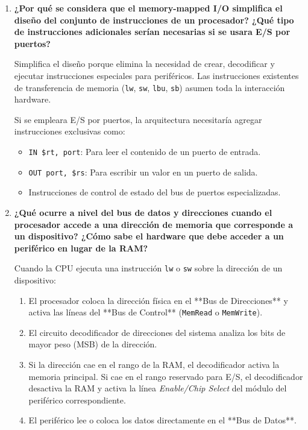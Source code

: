 \documentclass[12pt,letterpaper]{article}
\begin{document}
\begin{enumerate}
    \item \textbf{\large\color{UCBlue}¿Por qué se considera que el memory-mapped I/O simplifica el diseño del conjunto de instrucciones de un procesador? ¿Qué tipo de instrucciones adicionales serían necesarias si se usara E/S por puertos?}
    
    \vspace{0.2cm}
    Simplifica el diseño porque elimina la necesidad de crear, decodificar y ejecutar instrucciones especiales para periféricos. Las instrucciones existentes de transferencia de memoria (\texttt{lw}, \texttt{sw}, \texttt{lbu}, \texttt{sb}) asumen toda la interacción hardware.
    
    Si se empleara E/S por puertos, la arquitectura necesitaría agregar instrucciones exclusivas como:
    \begin{itemize}
        \item \texttt{IN \$rt, port}: Para leer el contenido de un puerto de entrada.
        \item \texttt{OUT port, \$rs}: Para escribir un valor en un puerto de salida.
        \item Instrucciones de control de estado del bus de puertos especializadas.
    \end{itemize}

    \item \textbf{\large\color{UCBlue}¿Qué ocurre a nivel del bus de datos y direcciones cuando el procesador accede a una dirección de memoria que corresponde a un dispositivo? ¿Cómo sabe el hardware que debe acceder a un periférico en lugar de la RAM?}
    
    \vspace{0.2cm}
    Cuando la CPU ejecuta una instrucción \texttt{lw} o \texttt{sw} sobre la dirección de un dispositivo:
    \begin{enumerate}[label=\arabic*.]
        \item El procesador coloca la dirección física en el **Bus de Direcciones** y activa las líneas del **Bus de Control** (\texttt{MemRead} o \texttt{MemWrite}).
        \item El circuito decodificador de direcciones del sistema analiza los bits de mayor peso (MSB) de la dirección.
        \item Si la dirección cae en el rango de la RAM, el decodificador activa la memoria principal. Si cae en el rango reservado para E/S, el decodificador desactiva la RAM y activa la línea \textit{Enable/Chip Select} del módulo del periférico correspondiente.
        \item El periférico lee o coloca los datos directamente en el **Bus de Datos**.
    \end{enumerate}


\end{enumerate}
\end{document}
